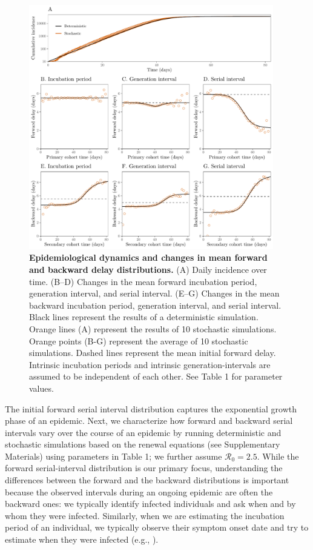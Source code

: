 \documentclass[12pt]{article}
\newcommand{\Rx}[1]{\ensuremath{{\mathcal R}_{#1}}\xspace}
\newcommand{\Ro}{\Rx{0}}
\begin{document}
\begin{figure}[!ht]
\begin{center}
\includegraphics[width=0.95\textwidth]{forward.pdf}
\caption{
\textbf{Epidemiological dynamics and changes in mean forward and backward delay distributions.}
(A) Daily incidence over time.
(B--D) Changes in the mean forward incubation period, generation interval, and serial interval.
(E--G) Changes in the mean backward incubation period, generation interval, and serial interval.
Black lines represent the results of a deterministic simulation.
Orange lines (A) represent the results of 10 stochastic simulations.
Orange points (B-G) represent the average of 10 stochastic simulations.
Dashed lines represent the mean initial forward delay.
Intrinsic incubation periods and intrinsic generation-intervals are assumed to be independent of each other.
See Table 1 for parameter values.
}
\label{fig:epi}
\end{center}
\end{figure}

The initial forward serial interval distribution captures the exponential growth phase of an epidemic.
Next, we characterize how forward and backward serial intervals vary over the course of an epidemic by running deterministic and stochastic simulations based on the renewal equations (see Supplementary Materials) using parameters in Table 1;
we further assume $\Ro=2.5$.
While the forward serial-interval distribution is our primary focus, understanding the differences between the forward and the backward distributions is important because the observed intervals during an ongoing epidemic are often the backward ones:
we typically identify infected individuals and ask when and by whom they were infected.
Similarly, when we are estimating the incubation period of an individual, we typically observe their symptom onset date and try to estimate when they were infected (e.g., \cite{backer2020incubation}).
\end{document}
